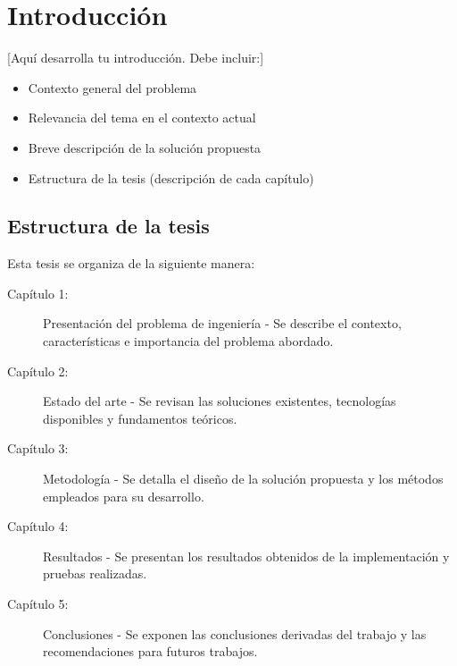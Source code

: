 
\chapter*{Introducción}


[Aquí desarrolla tu introducción. Debe incluir:]

\begin{itemize}
    \item Contexto general del problema
    \item Relevancia del tema en el contexto actual
    \item Breve descripción de la solución propuesta
    \item Estructura de la tesis (descripción de cada capítulo)
\end{itemize}

\section*{Estructura de la tesis}

Esta tesis se organiza de la siguiente manera:

\begin{description}
    \item[Capítulo 1:] Presentación del problema de ingeniería - Se describe el contexto, características e importancia del problema abordado.
    
    \item[Capítulo 2:] Estado del arte - Se revisan las soluciones existentes, tecnologías disponibles y fundamentos teóricos.
    
    \item[Capítulo 3:] Metodología - Se detalla el diseño de la solución propuesta y los métodos empleados para su desarrollo.
    
    \item[Capítulo 4:] Resultados - Se presentan los resultados obtenidos de la implementación y pruebas realizadas.
    
    \item[Capítulo 5:] Conclusiones - Se exponen las conclusiones derivadas del trabajo y las recomendaciones para futuros trabajos.
\end{description}